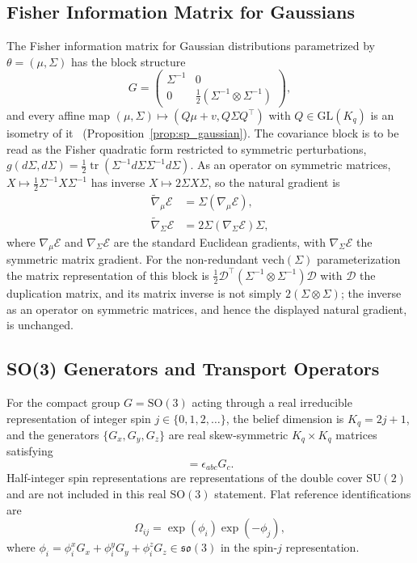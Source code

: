 \subsection{Fisher Information Matrix for Gaussians}
\label{app:fisher_gaussian}

The Fisher information matrix for Gaussian distributions parametrized by $\theta = (\mu, \Sigma)$ has the block structure
\begin{equation}
G = \begin{pmatrix}
\Sigma^{-1} & 0 \\
0 & \frac{1}{2}(\Sigma^{-1} \otimes \Sigma^{-1})
\end{pmatrix},
\end{equation}
and every affine map $(\mu, \Sigma) \mapsto (Q\mu + v, Q\Sigma Q^\top)$ with $Q \in \mathrm{GL}(K_q)$ is an isometry of it~\cite{Skovgaard1984} (Proposition~\ref{prop:sp_gaussian}). The covariance block is to be read as the Fisher quadratic form restricted to symmetric perturbations, $g(d\Sigma, d\Sigma) = \tfrac{1}{2}\operatorname{tr}(\Sigma^{-1} d\Sigma \Sigma^{-1} d\Sigma)$. As an operator on symmetric matrices, $X \mapsto \tfrac{1}{2}\Sigma^{-1}X\Sigma^{-1}$ has inverse $X \mapsto 2\Sigma X \Sigma$, so the natural gradient is
\begin{align}
\tilde{\nabla}_\mu \mathcal{E} &= \Sigma (\nabla_\mu \mathcal{E}), \\
\tilde{\nabla}_\Sigma \mathcal{E} &= 2\Sigma (\nabla_\Sigma \mathcal{E}) \Sigma,
\end{align}
where $\nabla_\mu \mathcal{E}$ and $\nabla_\Sigma \mathcal{E}$ are the standard Euclidean gradients, with $\nabla_\Sigma \mathcal{E}$ the symmetric matrix gradient. For the non-redundant $\mathrm{vech}(\Sigma)$ parameterization the matrix representation of this block is $\tfrac{1}{2}\mathcal{D}^\top(\Sigma^{-1} \otimes \Sigma^{-1})\mathcal{D}$ with $\mathcal{D}$ the duplication matrix, and its matrix inverse is not simply $2(\Sigma \otimes \Sigma)$; the inverse as an operator on symmetric matrices, and hence the displayed natural gradient, is unchanged.

\subsection{SO(3) Generators and Transport Operators}

For the compact group $G = \mathrm{SO}(3)$ acting through a real irreducible representation of integer spin $j\in\{0,1,2,\ldots\}$, the belief dimension is $K_q = 2j + 1$, and the generators $\{G_x, G_y, G_z\}$ are real skew-symmetric $K_q \times K_q$ matrices satisfying
\begin{equation}
[G_a, G_b] = \epsilon_{abc} G_c.
\end{equation}
Half-integer spin representations are representations of the double cover $\mathrm{SU}(2)$ and are not included in this real $\mathrm{SO}(3)$ statement. Flat reference identifications are
\begin{equation}
\Omega_{ij} = \exp(\phi_i) \exp(-\phi_j),
\end{equation}
where $\phi_i = \phi_i^x G_x + \phi_i^y G_y + \phi_i^z G_z \in \mathfrak{so}(3)$ in the spin-$j$ representation.

